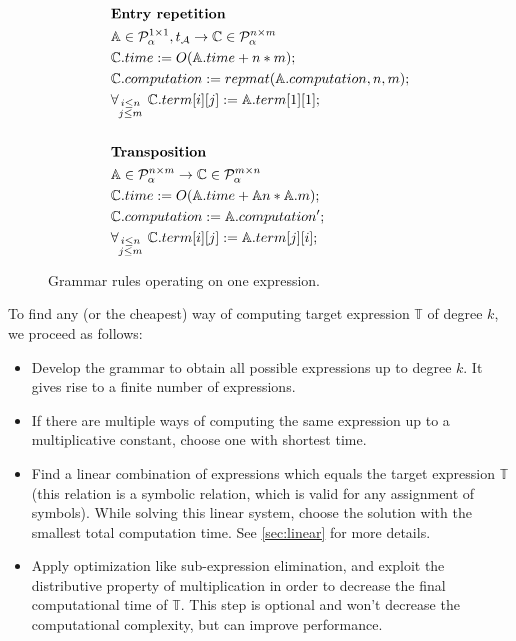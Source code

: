\begin{figure}
\begin{framed}
\begin{align*}
& \\
&\text{{\bf Entry repetition}}\\
&\mathbb{A} \in \mathcal{P}^{1 \times 1}_\alpha, t_\mathcal{A} \rightarrow \mathbb{C} \in \mathcal{P}^{n \times m}_\alpha \\
&\mathbb{C}.time := O(\mathbb{A}.time + n * m);\\
&\mathbb{C}.computation := repmat(\mathbb{A}.computation, n, m); \\
&\forall_{\substack{i \leq n\\ j \leq m}}\text{ } \mathbb{C}.term[i][j] := \mathbb{A}.term[1][1];\\
& \\
&\text{{\bf Transposition}}\\
&\mathbb{A} \in \mathcal{P}^{n \times m}_\alpha \rightarrow \mathbb{C} \in \mathcal{P}^{m \times n}_\alpha\\
&\mathbb{C}.time := O(\mathbb{A}.time + \mathbb{A}n * \mathbb{A}.m);\\
&\mathbb{C}.computation := \mathbb{A}.computation';\\
&\forall_{\substack{i \leq n\\j \leq m}}\text{ } \mathbb{C}.term[i][j] := \mathbb{A}.term[j][i];
\end{align*}
\caption{Grammar rules operating on one expression.}
\label{fig:rules}
\end{framed}
\end{figure}


To find any (or the cheapest) way of computing target expression $\mathbb{T}$ of degree $k$, we proceed as follows: 
\begin{itemize}
\item Develop the grammar to obtain all possible expressions up to degree
  $k$. It gives rise to a finite number of expressions. 
\item If there are multiple ways of computing the same expression up
  to a multiplicative constant, choose one with shortest time.
\item Find a linear combination of expressions which equals the target
  expression $\mathbb{T}$ (this relation is a symbolic relation, which
  is valid for any assignment of symbols). While solving this linear
  system, choose the solution with the smallest total computation
  time. See \ref{sec:linear} for more details.
\item Apply optimization like sub-expression elimination, and exploit
  the distributive property of multiplication in order to decrease the
  final computational time of $\mathbb{T}$. This step is optional and
  won't decrease the computational complexity, but can improve
  performance.
\end{itemize}

